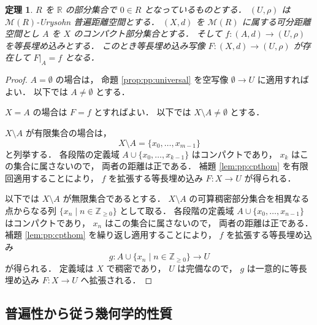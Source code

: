 \documentclass[leqno, 12pt]{jsarticle}
\newtheorem{thm}{定理}[section]
\newcommand{\zz}{\mathbb{Z}}
\newcommand{\yozz}[1]{\zz_{\ge #1}}
\newcommand{\rr}{\mathbb{R}}
\newcommand{\Met}[1]{\mathscr{M}(#1)}
\newcommand{\restr}[2]{#1|_{#2}}
\begin{document}
\begin{thm}\label{thm:pp:cptuniv}
$R$
を
$\rr$
の部分集合で
$0\in R$
となっているものとする．
$(U, \rho)$
は
$\Met{R}$-Urysohn
普遍距離空間とする．
$(X, d)$
を
$\Met{R}$
に属する可分距離空間とし
$A$
を
$X$
のコンパクト部分集合とする．%
そして
$f\colon  (A, d)\to (U, \rho)$
を等長埋め込みとする．
このとき等長埋め込み写像
$F\colon  (X, d)\to (U, \rho)$
が存在して
$\restr{F}{A}=f$
となる．
\end{thm}
\begin{proof}
$A=\emptyset$
の場合は，
命題
\ref{prop:pp:universal}
を空写像
$\emptyset\longrightarrow U$
に適用すればよい．
以下では
$A\neq\emptyset$
とする．

$X=A$
の場合は
$F=f$
とすればよい．
以下では
$X\setminus A\neq\emptyset$
とする．

$X\setminus A$
が有限集合の場合は，
\[
X\setminus A=\{x_0,\dots,x_{m-1}\}
\]
と列挙する．
各段階の定義域
$A\cup\{x_0,\dots,x_{k-1}\}$
はコンパクトであり，
$x_k$
はこの集合に属さないので，
両者の距離は正である．
補題
\ref{lem:pp:cpthom}
を有限回適用することにより，
$f$
を拡張する等長埋め込み
$F\colon X\longrightarrow U$
が得られる．

以下では
$X\setminus A$
が無限集合であるとする．
$X\setminus A$
の可算稠密部分集合を相異なる点からなる列
$\{x_{n}\mid n\in\yozz{0}\}$
として取る．
各段階の定義域
$A\cup\{x_0,\dots,x_{n-1}\}$
はコンパクトであり，
$x_{n}$
はこの集合に属さないので，
両者の距離は正である．
補題
\ref{lem:pp:cpthom}
を繰り返し適用することにより，
$f$
を拡張する等長埋め込み
\[
g\colon
A\cup\{x_n\mid n\in\yozz{0}\}
\longrightarrow U
\]
が得られる．
定義域は
$X$
で稠密であり，
$U$
は完備なので，
$g$
は一意的に等長埋め込み
$F\colon X\longrightarrow U$
へ拡張される．
\end{proof}

\subsection{普遍性から従う幾何学的性質}\label{subsec:uniqueness:geometric-consequences}
\end{document}
